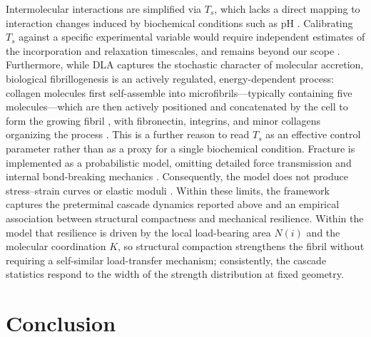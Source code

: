 \documentclass[aps,physrev,preprint,groupedaddress,linenumbers]{revtex4-2}
\newcommand{\rev}[1]{{\color{blue}#1}}
\begin{document}
Intermolecular interactions are simplified via $T_s$, which lacks a direct mapping to interaction changes induced by biochemical conditions such as pH \cite{Jiang2004}. \rev{Calibrating $T_s$ against a specific experimental variable would require independent estimates of the incorporation and relaxation timescales, and remains beyond our scope \cite{Yang2009,Kalbitzer2018}.} Furthermore, while DLA captures the stochastic character of molecular accretion, biological fibrillogenesis is an actively regulated, energy-dependent process: collagen molecules first self-assemble into microfibrils---typically containing five molecules---which are then actively positioned and concatenated by the cell to form the growing fibril \cite{Kadler1996}\rev{, with fibronectin, integrins, and minor collagens organizing the process \cite{Canty2005,Kadler2008}. This is a further reason to read $T_s$ as an effective control parameter rather than as a proxy for a single biochemical condition}. Fracture is implemented as a probabilistic model, omitting detailed force transmission and internal bond-breaking mechanics \cite{RuizFranco2022,Provenzano2006}. Consequently, the model does not produce stress--strain curves or elastic moduli \cite{Innocenti2022-lp}. \rev{Within these limits, the framework captures the preterminal cascade dynamics reported above and an empirical association between structural compactness and mechanical resilience. Within the model that resilience is driven by the local load-bearing area $N(i)$ and the molecular coordination $K$, so structural compaction strengthens the fibril without requiring a self-similar load-transfer mechanism; consistently, the cascade statistics respond to the width of the strength distribution at fixed geometry.}

\section{Conclusion}
\end{document}
